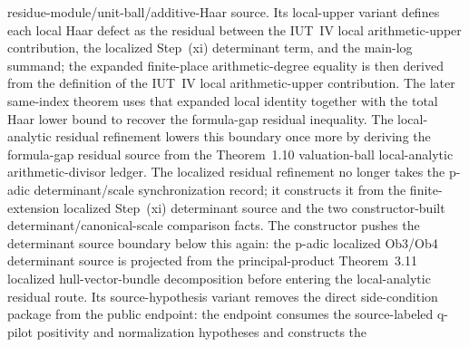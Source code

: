 \begin{proposition}
  residue-module/unit-ball/additive-Haar source.
  Its local-upper variant defines each local Haar defect as the residual
  between the IUT~IV local arithmetic-upper contribution, the localized
  Step~(xi) determinant term, and the main-log summand; the expanded
  finite-place arithmetic-degree equality is then derived from the definition
  of the IUT~IV local arithmetic-upper contribution.  The later same-index
  theorem uses that expanded local identity together with the total Haar lower
  bound to recover the formula-gap residual inequality.
  The local-analytic residual refinement
  lowers this boundary once more by deriving the formula-gap residual source
  from the Theorem~1.10 valuation-ball local-analytic arithmetic-divisor
  ledger.
  The localized residual refinement
  no longer takes the p-adic determinant/scale synchronization record; it
  constructs it from the finite-extension localized Step~(xi) determinant
  source and the two constructor-built determinant/canonical-scale
  comparison facts.
  The constructor
  pushes the determinant source boundary below this again: the p-adic
  localized Ob3/Ob4 determinant source is projected from the principal-product
  Theorem~3.11 localized hull-vector-bundle decomposition before entering the
  local-analytic residual route.
  Its source-hypothesis variant
  removes the direct side-condition package from the public endpoint: the
  endpoint consumes the source-labeled q-pilot positivity and normalization
  hypotheses and constructs the

\end{proposition}
